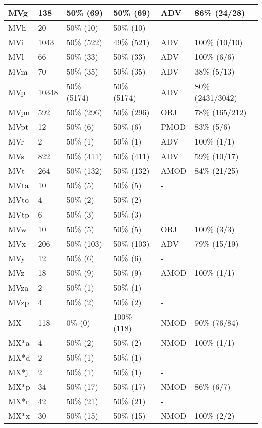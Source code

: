 \begin{figure*}
\begin{tabular}{|l|l|l|l||l|l|}
\hline
 MVg & 138 & 50\% (69) & 50\% (69) & ADV & 86\% (24/28) \\ 
\hline
 MVh & 20 & 50\% (10) & 50\% (10) & - &  \\ 
\hline
 MVi & 1043 & 50\% (522) & 49\% (521) & ADV & 100\% (10/10) \\ 
\hline
 MVl & 66 & 50\% (33) & 50\% (33) & ADV & 100\% (6/6) \\ 
\hline
 MVm & 70 & 50\% (35) & 50\% (35) & ADV & 38\% (5/13) \\ 
\hline
 MVp & 10348 & 50\% (5174) & 50\% (5174) & ADV & 80\% (2431/3042) \\ 
\hline
 MVpn & 592 & 50\% (296) & 50\% (296) & OBJ & 78\% (165/212) \\ 
\hline
 MVpt & 12 & 50\% (6) & 50\% (6) & PMOD & 83\% (5/6) \\ 
\hline
 MVr & 2 & 50\% (1) & 50\% (1) & ADV & 100\% (1/1) \\ 
\hline
 MVs & 822 & 50\% (411) & 50\% (411) & ADV & 59\% (10/17) \\ 
\hline
 MVt & 264 & 50\% (132) & 50\% (132) & AMOD & 84\% (21/25) \\ 
\hline
 MVta & 10 & 50\% (5) & 50\% (5) & - &  \\ 
\hline
 MVto & 4 & 50\% (2) & 50\% (2) & - &  \\ 
\hline
 MVtp & 6 & 50\% (3) & 50\% (3) & - &  \\ 
\hline
 MVw & 10 & 50\% (5) & 50\% (5) & OBJ & 100\% (3/3) \\ 
\hline
 MVx & 206 & 50\% (103) & 50\% (103) & ADV & 79\% (15/19) \\ 
\hline
 MVy & 12 & 50\% (6) & 50\% (6) & - &  \\ 
\hline
 MVz & 18 & 50\% (9) & 50\% (9) & AMOD & 100\% (1/1) \\ 
\hline
 MVza & 2 & 50\% (1) & 50\% (1) & - &  \\ 
\hline
 MVzp & 4 & 50\% (2) & 50\% (2) & - &  \\ 
\hline
 MX & 118 & 0\% (0) & 100\% (118) & NMOD & 90\% (76/84) \\ 
\hline
 MX*a & 4 & 50\% (2) & 50\% (2) & NMOD & 100\% (1/1) \\ 
\hline
 MX*d & 2 & 50\% (1) & 50\% (1) & - &  \\ 
\hline
 MX*j & 2 & 50\% (1) & 50\% (1) & - &  \\ 
\hline
 MX*p & 34 & 50\% (17) & 50\% (17) & NMOD & 86\% (6/7) \\ 
\hline
 MX*r & 42 & 50\% (21) & 50\% (21) & - &  \\ 
\hline
 MX*x & 30 & 50\% (15) & 50\% (15) & NMOD & 100\% (2/2) \\ 
\hline
\end{tabular}
\end{figure*}
